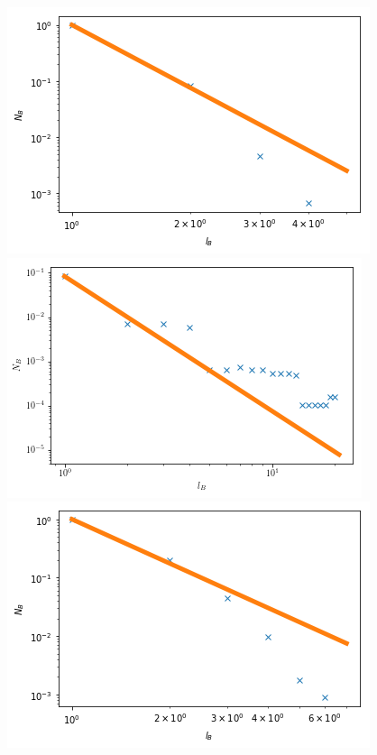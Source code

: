 \documentclass[12pt,twoside]{report}
\begin{document}
\begin{figure}[H]
\begin{center}
\begin{minipage}{0.45\linewidth}
\includegraphics[width=\linewidth]{figures/ba_hausdorff.png}
\end{minipage}%
\hfill
\begin{minipage}{0.45\linewidth}
\includegraphics[width=\linewidth]{figures/song_hausdorff.png}
\end{minipage}%
\hfill
\begin{minipage}{0.45\linewidth}
\includegraphics[width=\linewidth]{figures/uvl_hausdorff.png}

\end{minipage}
\end{center}
\end{figure}
\end{document}
